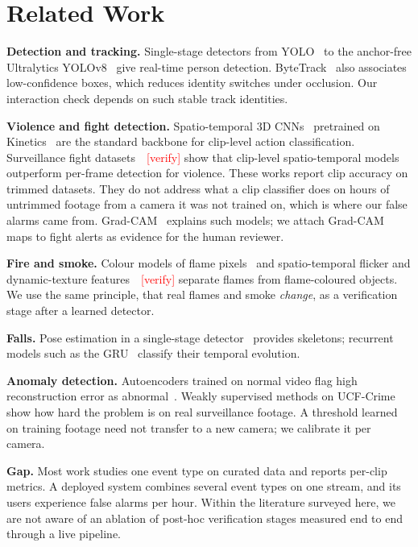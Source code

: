 \documentclass[conference]{IEEEtran}
\newcommand{\verify}{\textcolor{red}{[verify]}}
\begin{document}
\section{Related Work}
\textbf{Detection and tracking.} Single-stage detectors from YOLO~\cite{redmon2016} to the anchor-free Ultralytics YOLOv8~\cite{yolov8} give real-time person detection. ByteTrack~\cite{zhang2022} also associates low-confidence boxes, which reduces identity switches under occlusion. Our interaction check depends on such stable track identities.

\textbf{Violence and fight detection.} Spatio-temporal 3D CNNs~\cite{tran2018} pretrained on Kinetics~\cite{kay2017} are the standard backbone for clip-level action classification. Surveillance fight datasets~\cite{cheng2021,akti2019}~\verify{} show that clip-level spatio-temporal models outperform per-frame detection for violence. These works report clip accuracy on trimmed datasets. They do not address what a clip classifier does on hours of untrimmed footage from a camera it was not trained on, which is where our false alarms came from. Grad-CAM~\cite{selvaraju2017} explains such models; we attach Grad-CAM maps to fight alerts as evidence for the human reviewer.

\textbf{Fire and smoke.} Colour models of flame pixels~\cite{celik2009} and spatio-temporal flicker and dynamic-texture features~\cite{dimitropoulos2015}~\verify{} separate flames from flame-coloured objects. We use the same principle, that real flames and smoke \emph{change}, as a verification stage after a learned detector.

\textbf{Falls.} Pose estimation in a single-stage detector~\cite{maji2022} provides skeletons; recurrent models such as the GRU~\cite{cho2014} classify their temporal evolution.

\textbf{Anomaly detection.} Autoencoders trained on normal video flag high reconstruction error as abnormal~\cite{hasan2016}. Weakly supervised methods on UCF-Crime~\cite{sultani2018} show how hard the problem is on real surveillance footage. A threshold learned on training footage need not transfer to a new camera; we calibrate it per camera.

\textbf{Gap.} Most work studies one event type on curated data and reports per-clip metrics. A deployed system combines several event types on one stream, and its users experience false alarms per hour. Within the literature surveyed here, we are not aware of an ablation of post-hoc verification stages measured end to end through a live pipeline.
\end{document}
